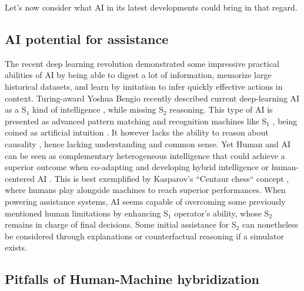 \documentclass{IOS-Book-Article}
\begin{document}
Let's now consider what AI in its latest developments could bring in that regard.

\subsection{AI potential for assistance}


The recent deep learning revolution demonstrated some impressive practical abilities of AI by being able to digest a lot of information, memorize large historical datasets, and learn by imitation to infer quickly effective actions in context. Turing-award Yoshua Bengio recently described current deep-learning AI as a S$_{1}$ kind of intelligence \cite{bengio2019system}, while missing S$_{2}$ reasoning. This type of AI is  presented as advanced pattern matching and recognition machines like S$_{1}$ \cite{kahneman2011thinking}, being coined as artificial intuition \cite{perez2018artificial}. It however lacks the ability to reason about causality \cite{pearl2018theoretical}, hence lacking understanding and common sense. Yet Human and AI can be seen as complementary heterogeneous intelligence that could achieve a superior outcome when co-adapting \cite{mackay2000responding} and developing hybrid intelligence \cite{dellermann2019hybrid} or human-centered AI \cite{shneiderman2022human}. This is best exemplified by Kasparov's ``Centaur chess`` concept \cite{case2018become}, where humans play alongside machines to reach superior performances. When powering assistance systems, AI seems capable of overcoming some previously mentioned human limitations by enhancing S$_{1}$ operator's ability, whose S$_{2}$ remains in charge of final decisions. Some initial assistance for S$_{2}$ can nonetheless be considered through explanations or counterfactual reasoning if a simulator exists.   

\subsection{Pitfalls of Human-Machine hybridization}\label{sec:pitfalls}
\end{document}
